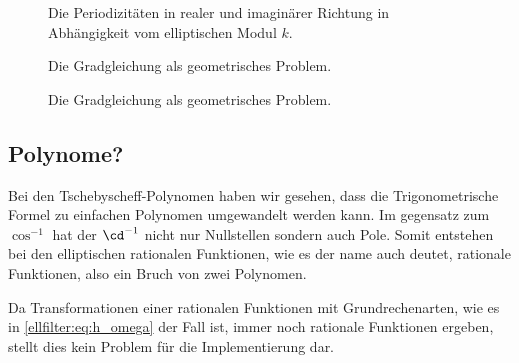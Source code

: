 \begin{figure}
    \centering
    
    \caption{Die Periodizitäten in realer und imaginärer Richtung in Abhängigkeit vom elliptischen Modul $k$.}
\end{figure}

\begin{figure}
    \centering
    
    \caption{Die Gradgleichung als geometrisches Problem.}
\end{figure}
\begin{figure}
    \centering
    
    \caption{Die Gradgleichung als geometrisches Problem.}
\end{figure}



\subsection{Polynome?}

Bei den Tschebyscheff-Polynomen haben wir gesehen, dass die Trigonometrische Formel zu einfachen Polynomen umgewandelt werden kann.
Im gegensatz zum $\cos^{-1}$ hat der $\cd^{-1}$ nicht nur Nullstellen sondern auch Pole.
Somit entstehen bei den elliptischen rationalen Funktionen, wie es der name auch deutet, rationale Funktionen, also ein Bruch von zwei Polynomen.

Da Transformationen einer rationalen Funktionen mit Grundrechenarten, wie es in \eqref{ellfilter:eq:h_omega} der Fall ist, immer noch rationale Funktionen ergeben, stellt dies kein Problem für die Implementierung dar.
